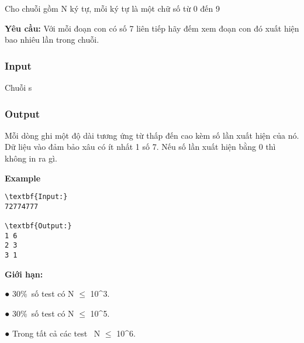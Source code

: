 

Cho chuỗi gồm N ký tự, mỗi ký tự là một chữ số từ 0 đến 9

\textbf{Yêu cầu:} Với mỗi đoạn con có số 7 liên tiếp hãy đếm xem đoạn con đó xuất hiện bao nhiêu lần trong chuỗi.

\subsubsection{Input}

Chuỗi s

\subsubsection{Output}

Mỗi dòng ghi một độ dài tương ứng từ thấp đến cao kèm số lần xuất hiện của nó. Dữ liệu vào đảm bảo xâu có ít nhất 1 số 7. Nếu số lần xuất hiện bằng 0 thì không in ra gì.

\textbf{Example }
\begin{verbatim}
\textbf{Input:}
72774777

\textbf{Output:}
1 6
2 3
3 1
\end{verbatim}

\textbf{Giới hạn:}

● 30\% số test có N  $\le$  10^3.

● 30\% số test có N  $\le$  10^5.

● Trong tất cả các test  N  $\le$  10^6.
